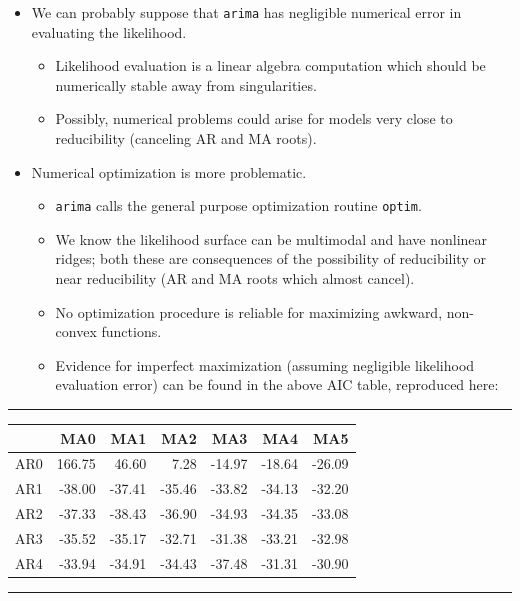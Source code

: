 \documentclass[]{article}
\begin{document}
\begin{itemize}
\item
  We can probably suppose that \texttt{arima} has negligible numerical
  error in evaluating the likelihood.

  \begin{itemize}
  \item
    Likelihood evaluation is a linear algebra computation which should
    be numerically stable away from singularities.
  \item
    Possibly, numerical problems could arise for models very close to
    reducibility (canceling AR and MA roots).
  \end{itemize}
\item
  Numerical optimization is more problematic.

  \begin{itemize}
  \item
    \texttt{arima} calls the general purpose optimization routine
    \texttt{optim}.
  \item
    We know the likelihood surface can be multimodal and have nonlinear
    ridges; both these are consequences of the possibility of
    reducibility or near reducibility (AR and MA roots which almost
    cancel).
  \item
    No optimization procedure is reliable for maximizing awkward,
    non-convex functions.
  \item
    Evidence for imperfect maximization (assuming negligible likelihood
    evaluation error) can be found in the above AIC table, reproduced
    here:
  \end{itemize}
\end{itemize}

\begin{center}\rule{0.5\linewidth}{\linethickness}\end{center}

\begin{longtable}[]{@{}lrrrrrr@{}}
\toprule
& MA0 & MA1 & MA2 & MA3 & MA4 & MA5\tabularnewline
\midrule
\endhead
 AR0 & 166.75 & 46.60 & 7.28 & -14.97 & -18.64 & -26.09\tabularnewline
 AR1 & -38.00 & -37.41 & -35.46 & -33.82 & -34.13 &
-32.20\tabularnewline
 AR2 & -37.33 & -38.43 & -36.90 & -34.93 & -34.35 &
-33.08\tabularnewline
 AR3 & -35.52 & -35.17 & -32.71 & -31.38 & -33.21 &
-32.98\tabularnewline
 AR4 & -33.94 & -34.91 & -34.43 & -37.48 & -31.31 &
-30.90\tabularnewline
\bottomrule
\end{longtable}

\begin{center}\rule{0.5\linewidth}{\linethickness}\end{center}
\end{document}
